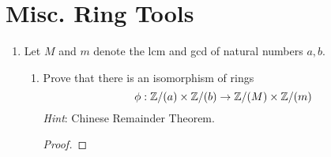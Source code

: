 \documentclass[../psets.tex]{subfiles}
\begin{document}
\section{Misc. Ring Tools}
\begin{enumerate}
    \item {}Let $M$ and $m$ denote the lcm and gcd of natural numbers $a,b$.
    \begin{enumerate}
        \item Prove that there is an isomorphism of rings
        \begin{equation*}
            \phi:\mathbb{Z}/(a)\times\mathbb{Z}/(b)\to\mathbb{Z}/(M)\times\mathbb{Z}/(m)
        \end{equation*}
        \emph{Hint}: Chinese Remainder Theorem.
        \begin{proof}







\end{proof}
\end{enumerate}
\end{enumerate}
\end{document}
